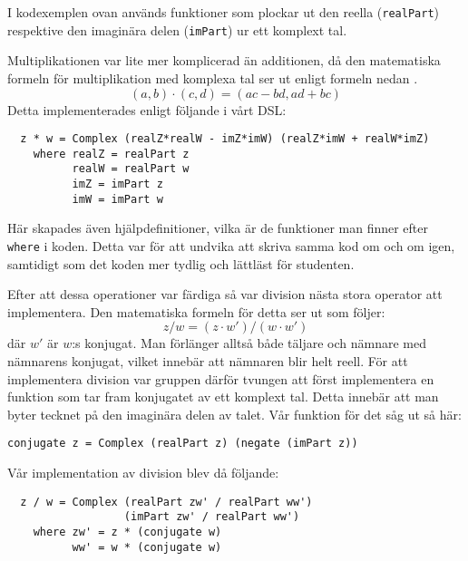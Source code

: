 \documentclass[12pt,a4paper,twoside,openright]{article}
\begin{document}
I kodexemplen ovan används funktioner som plockar ut den reella
(\texttt{realPart}) respektive den imaginära delen
(\texttt{imPart}) ur ett komplext tal.

Multiplikationen var lite mer komplicerad än additionen, då den
matematiska formeln för multiplikation med komplexa tal ser ut enligt
formeln nedan \cite{conway1978functions}.
\[(a, b) \cdot (c, d) = (ac - bd, ad + bc) \]
Detta implementerades enligt följande i vårt DSL:
\begin{verbatim}
  z * w = Complex (realZ*realW - imZ*imW) (realZ*imW + realW*imZ)
    where realZ = realPart z
          realW = realPart w
          imZ = imPart z
          imW = imPart w
\end{verbatim}

Här skapades även hjälpdefinitioner, vilka är de funktioner man finner
efter \texttt{where} i koden. Detta var för att undvika
att skriva samma kod om och om igen, samtidigt som det koden mer
tydlig och lättläst för studenten.

Efter att dessa operationer var färdiga så var division nästa stora
operator att implementera. Den matematiska formeln för detta ser ut
som följer:
\[ z / w = (z \cdot w') / (w \cdot w') \]
där \(w'\) är \(w\):s konjugat.
Man förlänger alltså både täljare och nämnare med nämnarens konjugat,
vilket innebär att nämnaren blir helt reell. För att implementera
division var gruppen därför tvungen att först implementera en funktion
som tar fram konjugatet av ett komplext tal. Detta innebär att man
byter tecknet på den imaginära delen av talet. Vår funktion för det
såg ut så här:

\begin{verbatim}
conjugate z = Complex (realPart z) (negate (imPart z))
\end{verbatim}
Vår implementation av division blev då följande:

\begin{verbatim}
  z / w = Complex (realPart zw' / realPart ww')
                  (imPart zw' / realPart ww')
    where zw' = z * (conjugate w)
          ww' = w * (conjugate w)
\end{verbatim}
\end{document}
